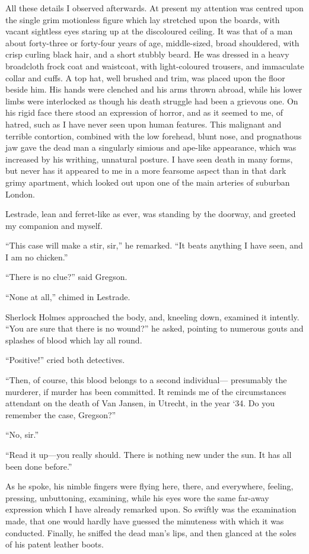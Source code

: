 \documentclass[12pt]{book}
\begin{document}
All these details I observed afterwards. At present my attention was centred upon the single grim motionless figure which lay stretched upon the boards, with vacant sightless eyes staring up at the discoloured ceiling. It was that of a man about forty-three or forty-four years of age, middle-sized, broad shouldered, with crisp curling black hair, and a short stubbly beard. He was dressed in a heavy broadcloth frock coat and waistcoat, with light-coloured trousers, and immaculate collar and cuffs. A top hat, well brushed and trim, was placed upon the floor beside him. His hands were clenched and his arms thrown abroad, while his lower limbs were interlocked as though his death struggle had been a grievous one. On his rigid face there stood an expression of horror, and as it seemed to me, of hatred, such as I have never seen upon human features. This malignant and terrible contortion, combined with the low forehead, blunt nose, and prognathous jaw gave the dead man a singularly simious and ape-like appearance, which was increased by his writhing, unnatural posture. I have seen death in many forms, but never has it appeared to me in a more fearsome aspect than in that dark grimy apartment, which looked out upon one of the main arteries of suburban London. 

Lestrade, lean and ferret-like as ever, was standing by the doorway, and greeted my companion and myself. 

“This case will make a stir, sir,” he remarked. “It beats anything I have seen, and I am no chicken.” 

“There is no clue?” said Gregson. 

“None at all,” chimed in Lestrade. 

Sherlock Holmes approached the body, and, kneeling down, examined it intently. “You are sure that there is no wound?” he asked, pointing to numerous gouts and splashes of blood which lay all round. 

“Positive!” cried both detectives. 

“Then, of course, this blood belongs to a second individual— presumably the murderer, if murder has been committed. It reminds me of the circumstances attendant on the death of Van Jansen, in Utrecht, in the year ‘34. Do you remember the case, Gregson?” 

“No, sir.” 

“Read it up—you really should. There is nothing new under the sun. It has all been done before.” 

As he spoke, his nimble fingers were flying here, there, and everywhere, feeling, pressing, unbuttoning, examining, while his eyes wore the same far-away expression which I have already remarked upon. So swiftly was the examination made, that one would hardly have guessed the minuteness with which it was conducted. Finally, he sniffed the dead man’s lips, and then glanced at the soles of his patent leather boots. 
\end{document}
